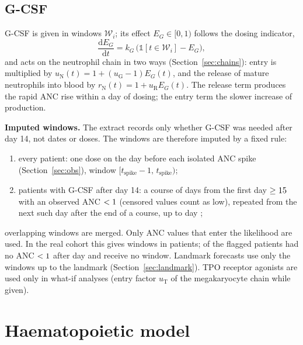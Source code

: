 \documentclass[11pt]{article}
\newcommand{\dd}{\mathrm{d}}
\newcommand{\one}{\mathbb{1}}
\begin{document}
\subsection{G-CSF}\label{sec:gcsf}
G-CSF is given in windows $\mathcal W_i$; its effect $E_G\in[0,1)$ follows the dosing indicator,
\begin{equation}
\frac{\dd E_G}{\dd t} = k_G\,\bigl(\one[t\in\mathcal W_i] - E_G\bigr), \label{eq:gcsf}
\end{equation}
and acts on the neutrophil chain in two ways (Section~\ref{sec:chains}): entry is multiplied by $u_{\mathrm{N}}(t)=1+(u_{\mathrm{G}}-1)E_G(t)$, and the release of mature neutrophils into blood by $r_{\mathrm{N}}(t)=1+u_{\mathrm{R}}E_G(t)$. The release term produces the rapid ANC rise within a day of dosing; the entry term the slower increase of production.

\textbf{Imputed windows.} The extract records only whether G-CSF was needed after day 14, not dates or doses. The windows are therefore imputed by a fixed rule:
\begin{enumerate}
\item every patient: one dose on the day before each isolated ANC spike (Section~\ref{sec:obs}), window $[t_{\mathrm{spike}}-1,\,t_{\mathrm{spike}})$;
\item patients with G-CSF after day 14: a course of \valGcsfDays{} days from the first day $\geq15$ with an observed ANC $<1$ (censored values count as low), repeated from the next such day after the end of a course, up to day \valGcsfUntil;
\end{enumerate}
overlapping windows are merged. Only ANC values that enter the likelihood are used. In the real cohort this gives \valGcsfWin{} windows in \valGcsfPts{} patients; \valGcsfNoWin{} of the \valGcsfFlagged{} flagged patients had no ANC $<1$ after day \valGcsfFrom{} and receive no window. Landmark forecasts use only the windows up to the landmark (Section~\ref{sec:landmark}). TPO receptor agonists are used only in what-if analyses (entry factor $u_{\mathrm{T}}$ of the megakaryocyte chain while given).

\section{Haematopoietic model}\label{sec:haem}
\end{document}
